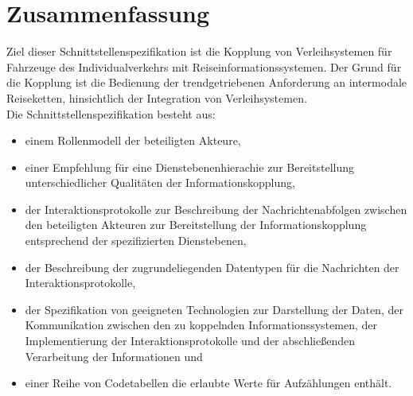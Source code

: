 \chapter{Zusammenfassung}
\label{cha:Zusammenfassung}

Ziel dieser Schnittstellenspezifikation ist die Kopplung von Verleihsystemen für Fahrzeuge des Individualverkehrs mit Reiseinformationssystemen. Der Grund für die Kopplung ist die Bedienung der trendgetriebenen Anforderung an intermodale Reiseketten,  hinsichtlich der Integration von Verleihsystemen.\\

Die Schnittstellenspezifikation besteht aus:\begin{itemize}
\item einem Rollenmodell der beteiligten Akteure, 
\item einer Empfehlung für eine Dienstebenenhierachie zur Bereitstellung unterschiedlicher Qualitäten der Informationskopplung, 
\item der Interaktionsprotokolle zur Beschreibung der Nachrichtenabfolgen zwischen den beteiligten Akteuren zur Bereitstellung der Informationskopplung entsprechend der spezifizierten Dienstebenen,
\item der Beschreibung der zugrundeliegenden Datentypen für die Nachrichten der Interaktionsprotokolle,
\item der Spezifikation von geeigneten Technologien zur Darstellung der Daten, der Kommunikation zwischen den zu koppelnden Informationssystemen, der Implementierung der Interaktionsprotokolle und der abschließenden Verarbeitung der Informationen und
\item einer Reihe von Codetabellen die erlaubte Werte für Aufzählungen enthält.
\end{itemize}

